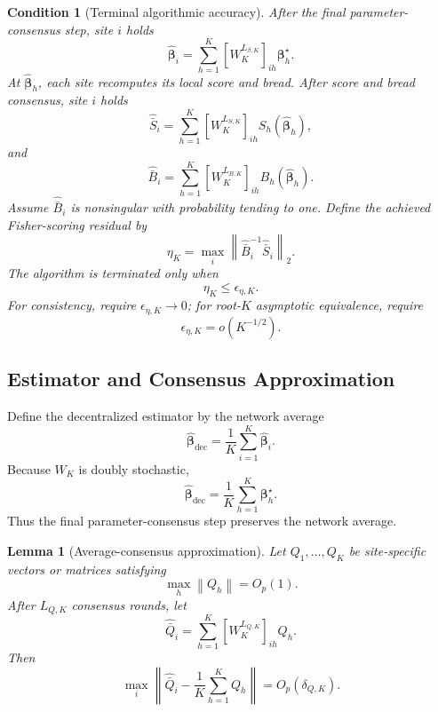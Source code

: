 \documentclass[12pt]{article}
\newtheorem{lemma}[theorem]{Lemma}
\newtheorem{condition}{Condition}[section]
\theoremstyle{remark}
\numberwithin{equation}{section}
\newcommand{\bbeta}{\boldsymbol{\beta}}
\newcommand{\norm}[1]{\left\lVert#1\right\rVert}
\begin{document}
\begin{condition}[Terminal algorithmic accuracy]
\label{cond:supp_terminal_accuracy}
After the final parameter-consensus step, site \(i\) holds
\begin{equation}
\widehat{\bbeta}_i
=
\sum_{h=1}^K
\left[W_K^{L_{\beta,K}}\right]_{ih}
\bbeta_h^\star.
\label{eq:supp_final_beta_i}
\end{equation}
At \(\widehat{\bbeta}_h\), each site recomputes its local score and bread.
After score and bread consensus, site \(i\) holds
\[
\widehat{\bar S}_i
=
\sum_{h=1}^K
\left[W_K^{L_{S,K}}\right]_{ih}
S_h(\widehat{\bbeta}_h),
\]
and
\[
\widehat{\bar B}_i
=
\sum_{h=1}^K
\left[W_K^{L_{B,K}}\right]_{ih}
B_h(\widehat{\bbeta}_h).
\]
Assume \(\widehat{\bar B}_i\) is nonsingular with probability tending to
one. Define the achieved Fisher-scoring residual by
\begin{equation}
\eta_K
=
\max_i
\norm{\widehat{\bar B}_i^{-1}\widehat{\bar S}_i}_2.
\label{eq:supp_terminal_residual}
\end{equation}
The algorithm is terminated only when
\[
\eta_K\le\epsilon_{\eta,K}.
\]
For consistency, require \(\epsilon_{\eta,K}\to0\); for root-\(K\)
asymptotic equivalence, require
\[
\epsilon_{\eta,K}=o(K^{-1/2}).
\]
\end{condition}


\subsection{Estimator and Consensus Approximation}

Define the decentralized estimator by the network average
\begin{equation}
\widehat{\bbeta}_{\mathrm{dec}}
=
\frac1K\sum_{i=1}^K\widehat{\bbeta}_i.
\label{eq:supp_beta_dec}
\end{equation}
Because \(W_K\) is doubly stochastic,
\[
\widehat{\bbeta}_{\mathrm{dec}}
=
\frac1K\sum_{h=1}^K\bbeta_h^\star.
\]
Thus the final parameter-consensus step preserves the network average.

\begin{lemma}[Average-consensus approximation]
\label{lem:supp_average_consensus}
Let \(Q_1,\ldots,Q_K\) be site-specific vectors or matrices satisfying
\[
\max_h\norm{Q_h}=O_p(1).
\]
After \(L_{Q,K}\) consensus rounds, let
\[
\widehat{\bar Q}_i
=
\sum_{h=1}^K
\left[W_K^{L_{Q,K}}\right]_{ih}Q_h.
\]
Then
\[
\max_i
\left\|
\widehat{\bar Q}_i
-
\frac1K\sum_{h=1}^KQ_h
\right\|
=
O_p(\delta_{Q,K}).
\]
\end{lemma}
\end{document}
